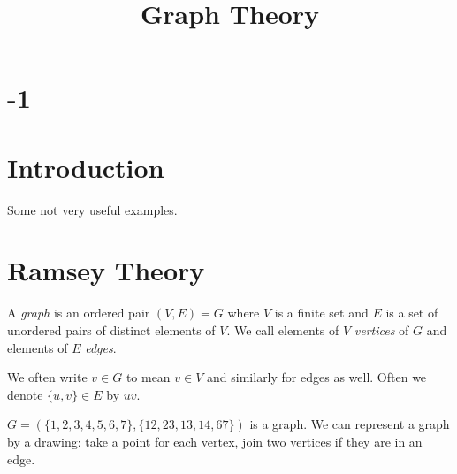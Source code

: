 \documentclass[a4paper]{article}
\begin{document}
\title{Graph Theory}

\maketitle

\newpage

\tableofcontents

\newpage

\section{-1}


\newpage

\section{Introduction}

Some not very useful examples.

\newpage

\section{Ramsey Theory}

\begin{defi}
A \emph{graph} is an ordered pair $(V,E) = G$ where $V$ is a finite set and $E$ is a set of unordered pairs of distinct elements of $V$. We call elements of $V$ \emph{vertices} of $G$ and elements of $E$ \emph{edges}.

We often write $v \in G$ to mean $v \in V$ and similarly for edges as well. Often we denote $\{u,v\} \in E$ by $uv$.
\end{defi}

\begin{eg}
$G = (\{1,2,3,4,5,6,7\},\{12,23,13,14,67\})$ is a graph. We can represent a graph by a drawing: take a point for each vertex, join two vertices if they are in an edge.


\end{eg}
\end{document}

